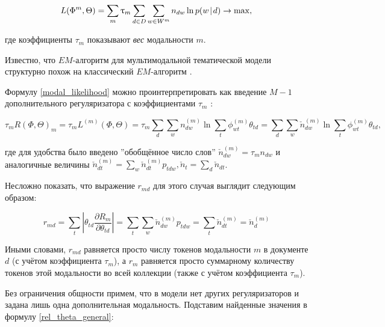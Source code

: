  

\[ 

L(\Phi^m, \Theta) = \sum_m \tau_m \sum_{d\in D} \sum_{w \in W^m} n_{dw} \ln p(w \cond d) \rightarrow \max, \label{modal_likelihood} 

\] 

где коэффициенты $\tau_m$ показывают \textit{вес} модальности $m$. 

 

Известно, что $EM$-алгоритм для мультимодальной тематической модели структурно похож на классический $EM$-алгоритм \cite{yanina}\cite{vorontsov2015non}\cite{bulatov}.  

 

Формулу \ref{modal_likelihood} можно проинтерпретировать как введение $M-1$ дополнительного регуляризатора с коэффициентами $\tau_m$ \cite{yanina}: 

 

\[ 

\tau_m R(\Phi, \Theta)_m = \tau_m L^{(m)}(\Phi, \Theta) = \tau_m  \sum_d \sum_w n_{dw}^{(m)} \ln \sum_t \phi_{wt}^{(m)}\theta_{td} =  

\sum_d \sum_w \check{n}_{dw}^{(m)} \ln \sum_t \phi_{wt}^{(m)}\theta_{td}, 

\] 

 

где для удобства было введено ''обобщённое число слов'' $\check{n}_{dw}^{(m)} = \tau_m n_{dw}$ и аналогичные величины $\check{n}_{dt}^{(m)} = \sum_w \check{n}_{dt}^{(m)} p_{tdw}, \check{n}_t = \sum_d \check{n}_{dt}$. 

 

Несложно показать, что выражение $r_{md}$ для этого случая выглядит следующим образом: 

 

\[ 

r_{md} = \sum_t |\theta_{td} \frac{\partial R_m}{\partial \theta_{td}}| = \sum_t \sum_w \check{n}_{dw}^{(m)} p_{tdw} = \sum_t  \check{n}_{dt}^{(m)} = \check{n}_{d}^{(m)} 

\] 

 

Иными словами, $r_{md}$ равняется просто числу токенов модальности $m$ в документе $d$ (с учётом коэффициента $\tau_m$), а $r_m$ равняется просто суммарному количеству токенов этой модальности во всей коллекции (также с учётом коэффициента $\tau_m$). 

 

Без ограничения общности примем, что в модели нет других регуляризаторов и задана лишь одна дополнительная модальность. Подставим найденные значения в формулу \ref{rel_theta_general}: 

